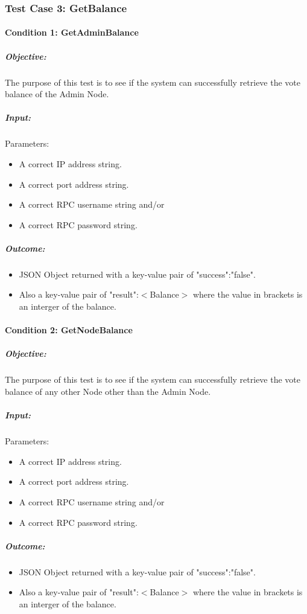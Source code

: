 \documentclass[11pt]{article}
\begin{document}
	\subsubsection{Test Case 3: GetBalance}
	\paragraph{Condition 1: GetAdminBalance}	
	\subparagraph{Objective:}
	The purpose of this test is to see if the system can successfully retrieve the vote balance of the Admin Node.
	\subparagraph{Input:}
	Parameters:
	\begin{itemize}
		\item A correct IP address string.
		\item A correct port address string.
		\item A correct RPC username string and/or
		\item A correct RPC password string.
	\end{itemize}
	\subparagraph{Outcome:}
	\begin{itemize}
		\item JSON Object returned with a key-value pair of "success":"false".
		\item Also a key-value pair of "result":$<$Balance$>$ where the value in brackets is an interger of the balance.
	\end{itemize}
	
	\paragraph{Condition 2: GetNodeBalance}	
	\subparagraph{Objective:}
	The purpose of this test is to see if the system can successfully retrieve the vote balance of any other Node other than the Admin Node.
	\subparagraph{Input:}
	Parameters:
	\begin{itemize}
		\item A correct IP address string.
		\item A correct port address string.
		\item A correct RPC username string and/or
		\item A correct RPC password string.
	\end{itemize}
	\subparagraph{Outcome:}
	\begin{itemize}
		\item JSON Object returned with a key-value pair of "success":"false".
		\item Also a key-value pair of "result":$<$Balance$>$ where the value in brackets is an interger of the balance.
	\end{itemize}
	
\end{document}
